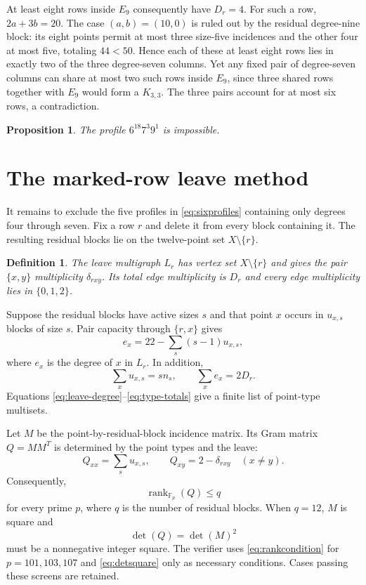 \documentclass[11pt]{amsart}
\newtheorem{proposition}[theorem]{Proposition}
\newtheorem{definition}[theorem]{Definition}
\DeclareMathOperator{\rank}{rank}
\begin{document}
At least eight rows inside $E_9$ consequently have $D_r=4$. For such a row, $2a+3b=20$. The case $(a,b)=(10,0)$ is ruled out by the residual degree-nine block: its eight points permit at most three size-five incidences and the other four at most five, totaling $44<50$. Hence each of these at least eight rows lies in exactly two of the three degree-seven columns. Yet any fixed pair of degree-seven columns can share at most two such rows inside $E_9$, since three shared rows together with $E_9$ would form a $K_{3,3}$. The three pairs account for at most six rows, a contradiction.

\begin{proposition}\label{prop:nine}
The profile $6^{18}7^3 9^1$ is impossible.
\end{proposition}

\section{The marked-row leave method}
It remains to exclude the five profiles in \eqref{eq:sixprofiles} containing only degrees four through seven. Fix a row $r$ and delete it from every block containing it. The resulting residual blocks lie on the twelve-point set $X\setminus\{r\}$.

\begin{definition}
The \emph{leave multigraph} $L_r$ has vertex set $X\setminus\{r\}$ and gives the pair $\{x,y\}$ multiplicity $\delta_{rxy}$. Its total edge multiplicity is $D_r$ and every edge multiplicity lies in $\{0,1,2\}$.
\end{definition}

Suppose the residual blocks have active sizes $s$ and that point $x$ occurs in $u_{x,s}$ blocks of size $s$. Pair capacity through $\{r,x\}$ gives
\begin{equation}\label{eq:leave-degree}
 e_x=22-\sum_s(s-1)u_{x,s},
\end{equation}
where $e_x$ is the degree of $x$ in $L_r$. In addition,
\begin{equation}\label{eq:type-totals}
 \sum_xu_{x,s}=s n_s,
 \qquad
 \sum_xe_x=2D_r.
\end{equation}
Equations \eqref{eq:leave-degree}--\eqref{eq:type-totals} give a finite list of point-type multisets.

Let $M$ be the point-by-residual-block incidence matrix. Its Gram matrix $Q=MM^T$ is determined by the point types and the leave:
\begin{equation}\label{eq:gram}
 Q_{xx}=\sum_su_{x,s},
 \qquad
 Q_{xy}=2-\delta_{rxy}\quad(x\ne y).
\end{equation}
Consequently,
\begin{equation}\label{eq:rankcondition}
  \rank_{\mathbb F_p}(Q)\le q
\end{equation}
for every prime $p$, where $q$ is the number of residual blocks. When $q=12$, $M$ is square and
\begin{equation}\label{eq:detsquare}
  \det(Q)=\det(M)^2
\end{equation}
must be a nonnegative integer square. The verifier uses \eqref{eq:rankcondition} for $p=101,103,107$ and \eqref{eq:detsquare} only as necessary conditions. Cases passing these screens are retained.
\end{document}
